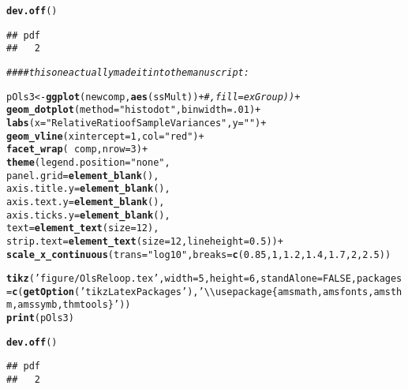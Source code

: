 \documentclass[12pt]{article}\usepackage[]{graphicx}\usepackage[]{xcolor}
\makeatletter
\newcommand{\hlnum}[1]{\textcolor[rgb]{0.686,0.059,0.569}{#1}}%
\newcommand{\hlstr}[1]{\textcolor[rgb]{0.192,0.494,0.8}{#1}}%
\newcommand{\hlcom}[1]{\textcolor[rgb]{0.678,0.584,0.686}{\textit{#1}}}%
\newcommand{\hlopt}[1]{\textcolor[rgb]{0,0,0}{#1}}%
\newcommand{\hlstd}[1]{\textcolor[rgb]{0.345,0.345,0.345}{#1}}%
\newcommand{\hlkwb}[1]{\textcolor[rgb]{0.69,0.353,0.396}{#1}}%
\newcommand{\hlkwc}[1]{\textcolor[rgb]{0.333,0.667,0.333}{#1}}%
\newcommand{\hlkwd}[1]{\textcolor[rgb]{0.737,0.353,0.396}{\textbf{#1}}}%
\newenvironment{kframe}{%
 \def\at@end@of@kframe{}%
 \ifinner\ifhmode%
  \def\at@end@of@kframe{\end{minipage}}%
  \begin{minipage}{\columnwidth}%
 \fi\fi%
 \def\FrameCommand##1{\hskip\@totalleftmargin \hskip-\fboxsep
 \colorbox{shadecolor}{##1}\hskip-\fboxsep
     \hskip-\linewidth \hskip-\@totalleftmargin \hskip\columnwidth}%
 \MakeFramed {\advance\hsize-\width
   \@totalleftmargin\z@ \linewidth\hsize
   \@setminipage}}%
 {\par\unskip\endMakeFramed%
 \at@end@of@kframe}
\newenvironment{knitrout}{}{} %
\makeatother
\begin{document}
\begin{knitrout}
\begin{kframe}
{\ttfamily\noindent\bfseries\color{errorcolor}{\#\# Error in print(pOls2): object 'pOls2' not found}}\begin{alltt}
\hlkwd{dev.off}\hlstd{()}
\end{alltt}
\begin{verbatim}
## pdf 
##   2
\end{verbatim}
\begin{alltt}
\hlcom{#### this one actually made it into the manuscript:}

\hlstd{pOls3} \hlkwb{<-} \hlkwd{ggplot}\hlstd{(newcomp,}\hlkwd{aes}\hlstd{(ssMult))}\hlopt{+}\hlcom{#,fill=exGroup))+}
    \hlkwd{geom_dotplot}\hlstd{(} \hlkwc{method}\hlstd{=}\hlstr{"histodot"}\hlstd{,} \hlkwc{binwidth} \hlstd{=} \hlnum{.01} \hlstd{)}  \hlopt{+}
    \hlkwd{labs}\hlstd{(} \hlkwc{x} \hlstd{=} \hlstr{"Relative Ratio of Sample Variances"}\hlstd{,} \hlkwc{y}\hlstd{=}\hlstr{""} \hlstd{)} \hlopt{+}
    \hlkwd{geom_vline}\hlstd{(} \hlkwc{xintercept} \hlstd{=} \hlnum{1}\hlstd{,} \hlkwc{col}\hlstd{=}\hlstr{"red"} \hlstd{)} \hlopt{+}
    \hlkwd{facet_wrap}\hlstd{(}\hlopt{~}\hlstd{comp,}\hlkwc{nrow}\hlstd{=}\hlnum{3}\hlstd{)}\hlopt{+}
    \hlkwd{theme}\hlstd{(}\hlkwc{legend.position} \hlstd{=} \hlstr{"none"}\hlstd{,}
        \hlkwc{panel.grid} \hlstd{=} \hlkwd{element_blank}\hlstd{(),}
        \hlkwc{axis.title.y} \hlstd{=} \hlkwd{element_blank}\hlstd{(),}
        \hlkwc{axis.text.y}\hlstd{=} \hlkwd{element_blank}\hlstd{(),}
        \hlkwc{axis.ticks.y} \hlstd{=} \hlkwd{element_blank}\hlstd{(),}
        \hlkwc{text}\hlstd{=}\hlkwd{element_text}\hlstd{(}\hlkwc{size}\hlstd{=}\hlnum{12}\hlstd{),}
        \hlkwc{strip.text}\hlstd{=}\hlkwd{element_text}\hlstd{(}\hlkwc{size}\hlstd{=}\hlnum{12}\hlstd{,}\hlkwc{lineheight}\hlstd{=}\hlnum{0.5}\hlstd{))}\hlopt{+}
  \hlkwd{scale_x_continuous}\hlstd{(}\hlkwc{trans}\hlstd{=}\hlstr{"log10"}\hlstd{,}\hlkwc{breaks}\hlstd{=}\hlkwd{c}\hlstd{(}\hlnum{0.85}\hlstd{,}\hlnum{1}\hlstd{,}\hlnum{1.2}\hlstd{,}\hlnum{1.4}\hlstd{,}\hlnum{1.7}\hlstd{,}\hlnum{2}\hlstd{,}\hlnum{2.5}\hlstd{))}
\end{alltt}


{\ttfamily\noindent\bfseries\color{errorcolor}{\#\# Error in ggplot(newcomp, aes(ssMult)): object 'newcomp' not found}}\begin{alltt}
\hlkwd{tikz}\hlstd{(}\hlstr{'figure/OlsReloop.tex'}\hlstd{,}\hlkwc{width}\hlstd{=}\hlnum{5}\hlstd{,}\hlkwc{height}\hlstd{=}\hlnum{6}\hlstd{,}\hlkwc{standAlone}\hlstd{=}\hlnum{FALSE}\hlstd{,}\hlkwc{packages}\hlstd{=} \hlkwd{c}\hlstd{(}\hlkwd{getOption}\hlstd{(}\hlstr{'tikzLatexPackages'}\hlstd{),}\hlstr{'\textbackslash{}\textbackslash{}usepackage\{amsmath,amsfonts,amsthm,amssymb,thmtools\}'}\hlstd{))}
\hlkwd{print}\hlstd{(pOls3)}
\end{alltt}


{\ttfamily\noindent\bfseries\color{errorcolor}{\#\# Error in print(pOls3): object 'pOls3' not found}}\begin{alltt}
\hlkwd{dev.off}\hlstd{()}
\end{alltt}
\begin{verbatim}
## pdf 
##   2
\end{verbatim}
\end{kframe}
\end{knitrout}
\end{document}
